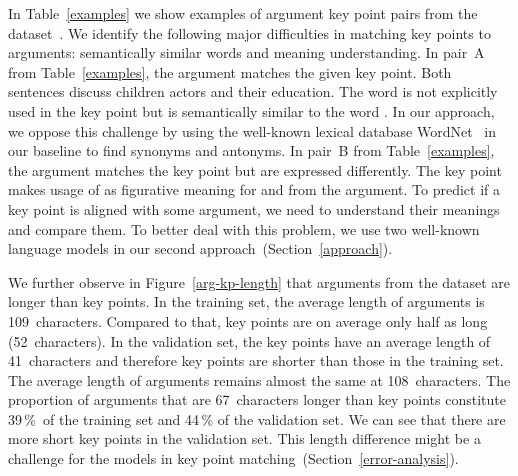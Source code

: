 In Table~\ref{examples} we show examples of argument key point pairs from the \ArgKP dataset~\cite{Bar-HaimEFKLS2020}. 
We identify the following major difficulties in matching key points to arguments: semantically similar words and meaning 
understanding.
In pair~A from Table~\ref{examples}, the argument matches the given key point. Both sentences discuss 
children actors and their education. The word  is not explicitly used in the key point but is 
semantically similar to the word . 
In our approach, we oppose this challenge by using the well-known lexical database WordNet~\cite{Miller1995} in our 
baseline to find synonyms and antonyms.
In pair~B from Table~\ref{examples}, the argument matches the key point but are expressed differently. 
The key point makes usage of  as figurative meaning for  and  from the argument. 
To predict if a key point is aligned with some argument, we need to understand their meanings and compare them. 
To better deal with this problem, we use two well-known language models in our second approach~(Section~\ref{approach}). 

We further observe in Figure~\ref{arg-kp-length} that arguments from the \ArgKP dataset are longer than key points.
In the training set, the average length of arguments is 109~characters. 
Compared to that, key points are on average only half as long (52~characters). 
In the validation set, the key points have an average length of 41~characters and therefore key points are shorter than those in the training set. 
The average length of arguments remains almost the same at 108~characters. 
The proportion of arguments that are 67~characters longer than key points constitute 39\,\%~of the training set 
and 44\,\% of the validation set. 
We can see that there are more short key points in the validation set. 
This length difference might be a challenge for the models in key point matching~(Section~\ref{error-analysis}).
